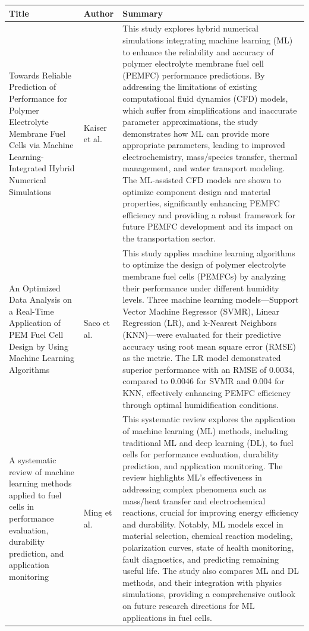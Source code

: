     \newpage \begin{table}[H]
    \centering
    \begin{tabularx}{\textwidth}{HIJ} %
    \toprule
    \textbf{Title} & \textbf{Author} & \textbf{Summary} \\ 
    \midrule
    Towards Reliable Prediction of Performance for Polymer Electrolyte Membrane Fuel Cells via Machine Learning-Integrated Hybrid Numerical Simulations & Kaiser et al. & This study explores hybrid numerical simulations integrating machine learning (ML) to enhance the reliability and accuracy of polymer electrolyte membrane fuel cell (PEMFC) performance predictions. By addressing the limitations of existing computational fluid dynamics (CFD) models, which suffer from simplifications and inaccurate parameter approximations, the study demonstrates how ML can provide more appropriate parameters, leading to improved electrochemistry, mass/species transfer, thermal management, and water transport modeling. The ML-assisted CFD models are shown to optimize component design and material properties, significantly enhancing PEMFC efficiency and providing a robust framework for future PEMFC development and its impact on the transportation sector. \\
    \midrule
    An Optimized Data Analysis on a Real-Time Application of PEM Fuel Cell Design by Using Machine Learning Algorithms & Saco et al. & This study applies machine learning algorithms to optimize the design of polymer electrolyte membrane fuel cells (PEMFCs) by analyzing their performance under different humidity levels. Three machine learning models—Support Vector Machine Regressor (SVMR), Linear Regression (LR), and k-Nearest Neighbors (KNN)—were evaluated for their predictive accuracy using root mean square error (RMSE) as the metric. The LR model demonstrated superior performance with an RMSE of 0.0034, compared to 0.0046 for SVMR and 0.004 for KNN, effectively enhancing PEMFC efficiency through optimal humidification conditions. \\
    \midrule
    A systematic review of machine learning methods applied to fuel cells in performance evaluation, durability prediction, and application monitoring & Ming et al. & This systematic review explores the application of machine learning (ML) methods, including traditional ML and deep learning (DL), to fuel cells for performance evaluation, durability prediction, and application monitoring. The review highlights ML's effectiveness in addressing complex phenomena such as mass/heat transfer and electrochemical reactions, crucial for improving energy efficiency and durability. Notably, ML models excel in material selection, chemical reaction modeling, polarization curves, state of health monitoring, fault diagnostics, and predicting remaining useful life. The study also compares ML and DL methods, and their integration with physics simulations, providing a comprehensive outlook on future research directions for ML applications in fuel cells. \\

\end{tabularx}
\end{table}
